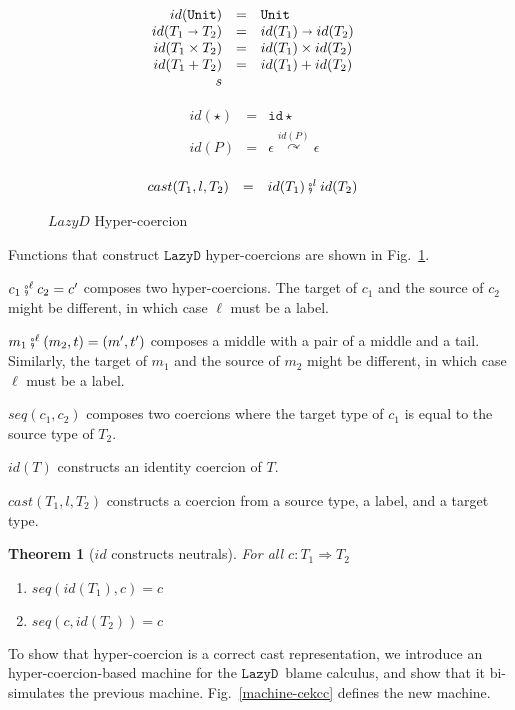 \documentclass[acmsmall,review,anonymous]{acmart}\settopmatter{printfolios=true,printccs=false,printacmref=false}
\newtheorem{theorem}{Theorem}[]
\newcommand{\figref}[1]{Fig.~\ref{#1}}
\newcommand{\funrule}[3]{#1 &=& #2 & #3\\}
\newcommand{\plus}[0]{+}
\newcommand{\lazyD}{$\mathtt{Lazy D}$}
\newcommand{\hyperCoercionI}[0]{\mathtt{id\star}}
\newcommand{\hyperCoercionC}[3]{#1 \overset{#2}{\curvearrowright} #3}
\newcommand{\POOunit}[0]{\mathtt{Unit}}
\newcommand{\POOfun}[2]{#1 \shortrightarrow #2}
\newcommand{\POOprod}[2]{#1 \times #2}
\newcommand{\POOsum}[2]{#1 \plus #2}
\begin{document}
\begin{figure}
	\[
	\begin{array}{rclr}
	\funrule{id(\POOunit)}{\POOunit}{}
	\funrule{id(\POOfun{T_1}{T_2})}{
		\POOfun{id(T_1)}{id(T_2)}
	}{}
	\funrule{id(\POOprod{T_1}{T_2})}{
		\POOprod{id(T_1)}{id(T_2)}
	}{}
	\funrule{id(\POOsum{T_1}{T_2})}{
		\POOsum{id(T_1)}{id(T_2)}
	}{}s
	\end{array}
	\]
	
	\[
	\begin{array}{rclr}
	\funrule{id(\star)}{
		\hyperCoercionI
	}{}
	\funrule{id(P)}{
		\hyperCoercionC{\epsilon}{id(P)}{\epsilon}
	}{}
	\end{array}
	\]
	
	\[
	\begin{array}{rclr}
	\funrule{cast(T_1,l,T_2)}{
		id(T_1) \fatsemi^l id(T_2)
	}{}
	\end{array}
	\]
	\caption{$Lazy D$ Hyper-coercion}
	\label{fig:HC-D}
\end{figure}

Functions that construct \lazyD{} hyper-coercions are shown in 
\figref{fig:HC-D}. 

$ c_1 \fatsemi^\ell c_2 = c' $ composes two hyper-coercions. The target of $ 
c_1 $ and the source of $ c_2 $ might be different, in which case $ \ell $ must 
be a label.

$ m_1 \fatsemi^\ell (m_2,t) = (m',t') $ composes a middle with a 
pair of a middle and a tail. Similarly, the target of $ m_1 $ and the source of 
$ m_2 $ might be different, in which case $ \ell $ must be a label.

$ seq(c_1,c_2) $ composes two coercions where the target type of $ c_1 $ is 
equal to the source type of $ T_2 $.

$ id(T) $ constructs an identity coercion of $ T $. 

$ cast(T_1,l,T_2) $ constructs a coercion from a source type, a label, and a 
target type. 

\begin{theorem}[$ id $ constructs neutrals] For all $ c : T_1 \Longrightarrow 
	T_2 $
	\begin{enumerate}
		\item $ seq(id(T_1),c) = c $
		\item $ seq(c,id(T_2)) = c $
	\end{enumerate}
\end{theorem}

To show that hyper-coercion is a correct cast representation, we introduce an 
hyper-coercion-based machine for the \lazyD\ blame calculus, and show that it 
bi-simulates the previous machine. 
\figref{machine-cekcc} defines the new machine.
\end{document}
